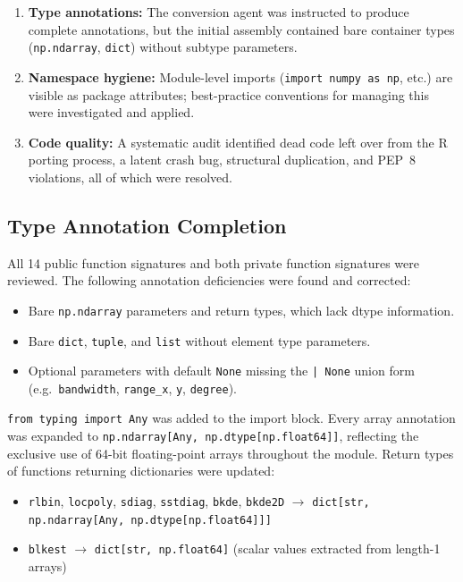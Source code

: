 \documentclass[12pt,a4paper]{article}
\begin{document}
\begin{enumerate}
  \item \textbf{Type annotations:} The conversion agent was instructed to produce complete annotations, but the initial assembly contained bare container types (\texttt{np.ndarray}, \texttt{dict}) without subtype parameters.
  \item \textbf{Namespace hygiene:} Module-level imports (\texttt{import numpy as np}, etc.) are visible as package attributes; best-practice conventions for managing this were investigated and applied.
  \item \textbf{Code quality:} A systematic audit identified dead code left over from the R porting process, a latent crash bug, structural duplication, and PEP~8 violations, all of which were resolved.
\end{enumerate}

\subsection{Type Annotation Completion}

All 14 public function signatures and both private function signatures were reviewed. The following annotation deficiencies were found and corrected:

\begin{itemize}
  \item Bare \texttt{np.ndarray} parameters and return types, which lack dtype information.
  \item Bare \texttt{dict}, \texttt{tuple}, and \texttt{list} without element type parameters.
  \item Optional parameters with default \texttt{None} missing the \texttt{| None} union form (e.g.\ \texttt{bandwidth}, \texttt{range\_x}, \texttt{y}, \texttt{degree}).
\end{itemize}

\texttt{from typing import Any} was added to the import block. Every array annotation was expanded to \texttt{np.ndarray[Any, np.dtype[np.float64]]}, reflecting the exclusive use of 64-bit floating-point arrays throughout the module. Return types of functions returning dictionaries were updated:

\begin{itemize}
  \item \texttt{rlbin}, \texttt{locpoly}, \texttt{sdiag}, \texttt{sstdiag}, \texttt{bkde}, \texttt{bkde2D} $\to$ \texttt{dict[str, np.ndarray[Any, np.dtype[np.float64]]]}
  \item \texttt{blkest} $\to$ \texttt{dict[str, np.float64]} (scalar values extracted from length-1 arrays)
\end{itemize}
\end{document}
